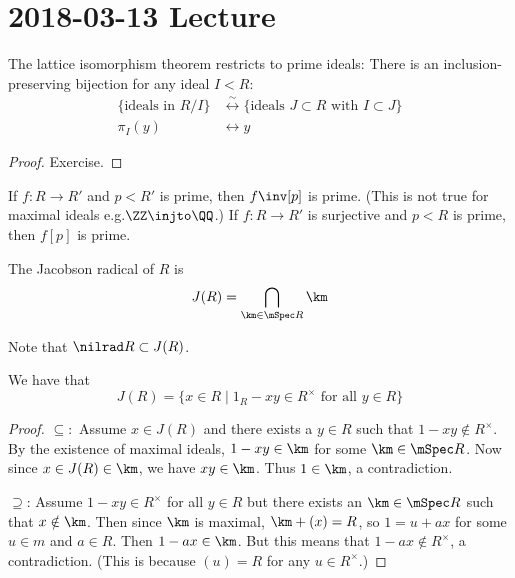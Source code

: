 \section{2018-03-13 Lecture}

\begin{prop}[0.17]
	The lattice isomorphism theorem restricts to prime ideals:
	There is an inclusion-preserving bijection for any ideal $I<R$:
	\begin{align*}
	\{\text{ideals in } R/I\} &\overset{\sim}{\longleftrightarrow} \{\text{ideals } J \subset R \text{ with } I \subset J\} \\
	\pi_I(y) &\longleftrightarrow y
	\end{align*}
\end{prop}

\begin{proof}
	Exercise.
\end{proof}

\begin{rmk}
	\begin{enum}
		\io If $f:R \to R'$ and $p<R'$ is prime, then $f\inv[p]$ is prime.
		(This is not true for maximal ideals e.g.\@ $\ZZ \injto \QQ$.)
		\io If $f:R \to R'$ is surjective and $p<R$ is prime, then $f[p]$ is prime.
	\end{enum}
\end{rmk}

\begin{defn}[0.18]
	The Jacobson radical of $R$ is
	\[J(R) = \bigcap_{\km \in \mSpec R} \km\]
\end{defn}

\begin{note}
	Note that $\nilrad R \subset J(R)$.
\end{note}

\begin{prop}[0.19]
	We have that
	\[J(R) = \{x \in R \mid 1_R - xy \in R^\times \text{ for all } y \in R\}\]
\end{prop}

\begin{proof}
	$\subseteq:$ Assume $x \in J(R)$ and there exists a $y \in R$ such that $1-xy \notin R^\times$.
	By the existence of maximal ideals, $1-xy \in \km$ for some $\km \in \mSpec R$.
	Now since $x \in J(R) \in \km$, we have $xy \in \km$.
	Thus $1 \in \km$, a contradiction.
	
	$\supseteq$: Assume $1-xy \in R^\times$ for all $y \in R$ but there exists an $\km \in \mSpec R$ such that $x \notin \km$.
	Then since $\km$ is maximal, $\km + (x) = R$, so $1=u+ax$ for some $u \in m$ and $a \in R$.
	Then $1-ax \in \km$.
	But this means that $1-ax \notin R^\times$, a contradiction.
	(This is because $(u)=R$ for any $u \in R^\times$.)
\end{proof}

